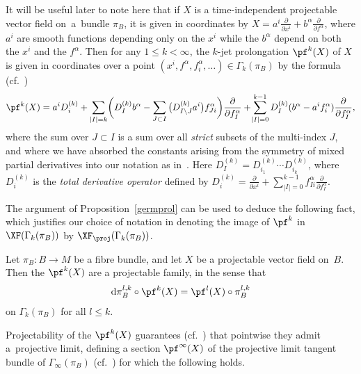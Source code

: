 It will be useful later to note here that if $X$ is a time-independent projectable vector field on~a~bundle $\pi_{B}$, it is given in coordinates by $X = a^{i}\frac{\partial}{\partial x^{i}} + b^{\alpha}\frac{\partial}{\partial f^{\alpha}}$, where $a^{i}$ are smooth functions depending only on the $x^{i}$ while the $b^{\alpha}$ depend on both the $x^{i}$ and the $f^{\alpha}$. Then for any $1\leq k<\infty$, the $k$-jet prolongation $\pf^{k}(X)$ of $X$ is given in coordinates over a point $(x^{i},f^{\alpha},f^{\alpha}_{i},\dots)\in \Gamma_{k}(\pi_{B})$ by the formula (cf.~\cite[Theorem~2.36]{olver})
\begin{gather}\label{prolongation}
\pf^{k}(X) = a^{i}D_{i}^{(k)}+\sum_{|I|=k}\!\bigg(D^{(k)}_{I}b^{\alpha}-\sum_{J\subset I}\big(D^{(k)}_{I\setminus J}a^{i}\big)f^{\alpha}_{Ji}\bigg)\frac{\partial}{\partial f^{\alpha}_{I}}+\!\sum_{|I|=0}^{k-1}D^{(k)}_{I}(b^{\alpha}-a^{i}f^{\alpha}_{i})\frac{\partial}{\partial f^{\alpha}_{I}},
\end{gather}
where the sum over $J\subset I$ is a sum over all \textit{strict} subsets of the multi-index $J$, and where we have absorbed the constants arising from the symmetry of mixed partial derivatives into our notation as in~\cite[equation~(1.15)]{varbi}. Here $D^{(k)}_{I} = D^{(k)}_{i_{1}}\cdots D^{(k)}_{i_{k}}$, where $D^{(k)}_{i}$ is the \textit{total derivative operator} defined by $D^{(k)}_{i} = \frac{\partial}{\partial x^{i}}+\sum_{|I|=0}^{k-1}f^{\alpha}_{Ii}\frac{\partial}{\partial f^{\alpha}_{I}}$.

The argument of Proposition~\ref{germprol} can be used to deduce the following fact, which justifies our choice of notation in denoting the image of $\pf^{k}$ in $\XF(\Gamma_{k}(\pi_{B}))$ by $\XF_{\proj}(\Gamma_{k}(\pi_{B}))$.

\begin{Proposition}
Let $\pi_{B}\colon B\rightarrow M$ be a fibre bundle, and let $X$ be a projectable vector field on~$B$. Then the $\pf^{k}(X)$ are a projectable family, in the sense that
\begin{gather*}
{\rm d}\pi_{B}^{l,k}\circ \pf^{k}(X) = \pf^{l}(X)\circ\pi_{B}^{l,k}
\end{gather*}
on $\Gamma_{k}(\pi_{B})$ for all $l\leq k$.
\end{Proposition}

Projectability of the $\pf^{k}(X)$ guarantees (cf.~\cite[equation~(1.11)]{varbi}) that pointwise they admit a~pro\-jective limit, defining a section $\pf^{\infty}(X)$ of the projective limit tangent bundle of $\Gamma_{\infty}(\pi_{B})$ (cf.~\cite[Chapter One, Section B]{varbi}) for which the following holds.

